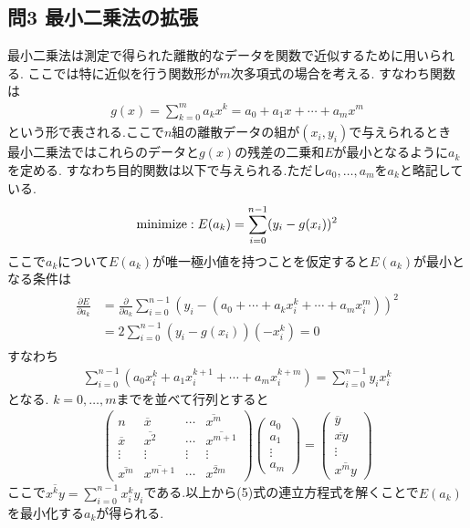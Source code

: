 \subsection*{問3 最小二乗法の拡張}
最小二乗法は測定で得られた離散的なデータを関数で近似するために用いられる.
ここでは特に近似を行う関数形が$m$次多項式の場合を考える.
すなわち関数は
\begin{align}
  g(x)=\sum_{k=0}^{m} a_kx^k=a_0+a_1x+\cdots+a_mx^m
\end{align}
という形で表される.ここで$n$組の離散データの組が$(x_i,y_i)$で与えられるとき
最小二乗法ではこれらのデータと$g(x)$の残差の二乗和$E$が最小となるように$a_k$を定める.
すなわち目的関数は以下で与えられる.ただし$a_0,\ldots,a_m$を$a_k$と略記している.
\begin{align}
  {\rm minimize}: E(a_k)=\sum_{i=0}^{n-1}(y_i-g(x_i))^2
\end{align}
ここで$a_k$について$E(a_k)$が唯一極小値を持つことを仮定すると$E(a_k)$が最小となる条件は
\begin{align}
  \begin{split}
    \frac{\partial E}{\partial a_k}&=\frac{\partial}{\partial a_k}\sum_{i=0}^{n-1}(y_i-(a_0+\cdots+a_kx_i^k+\cdots+a_mx_i^m))^2\\
    &=2\sum_{i=0}^{n-1}(y_i-g(x_i))(-x_i^k)=0
  \end{split}
\end{align}
すなわち
\begin{align}
  \sum_{i=0}^{n-1}(a_0x_i^k+a_1x_i^{k+1}+\cdots+a_mx_i^{k+m})=\sum_{i=0}^{n-1}y_ix_i^k
\end{align}
となる.
$k=0,\ldots,m$までを並べて行列とすると
\begin{align}
  \left(
    \begin{array}{cccc}
      n&\overline{x}&\cdots&\overline{x^m}\\
      \overline{x}&\overline{x^2}&\cdots&\overline{x^{m+1}}\\
      \vdots&\vdots&\vdots&\vdots\\
      \overline{x^m}&\overline{x^{m+1}}&\cdots&\overline{x^{2m}}
    \end{array}
  \right)
  \left(
    \begin{array}{c}
      a_0\\a_1\\\vdots\\a_m      
    \end{array}
  \right)=\left(
    \begin{array}{c}
      \overline{y}\\\overline{xy}\\\vdots\\\overline{x^my}
    \end{array}
  \right)
\end{align}
ここで$\overline{x^ky}=\sum_{i=0}^{n-1}x^k_iy_i$である.以上から(5)式の連立方程式を解くことで$E(a_k)$を最小化する$a_k$が得られる.